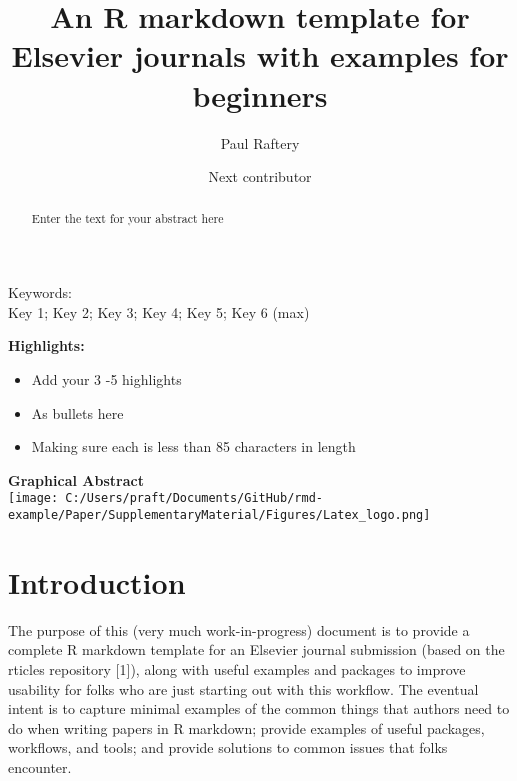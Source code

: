 \documentclass[]{elsarticle} %
\makeatletter
\providecommand{\tightlist}{%
  \setlength{\itemsep}{0pt}\setlength{\parskip}{0pt}}
\def\maxwidth{\ifdim\Gin@nat@width>\linewidth\linewidth
\else\Gin@nat@width\fi}
\let\Oldincludegraphics\includegraphics
\renewcommand{\includegraphics}[1]{\Oldincludegraphics[width=\maxwidth]{#1}}
\theoremstyle{definition}
\theoremstyle{definition}
\theoremstyle{definition}
\theoremstyle{remark}
\makeatother
\begin{document}
\begin{frontmatter}

  \title{An R markdown template for Elsevier journals with examples for beginners}
    \author[CBE]{Paul Raftery}
    \author[Organisation2]{Next contributor}
  
  
      \address[CBE]{Center for the Built Environment, UC Berkeley, 390 Wurster Hall,
Berkeley, CA, 94720, USA}
    \address[Organisation2]{Another organization, and their address}
  
  \begin{abstract}
  Enter the text for your abstract here
  \end{abstract}
  
 \end{frontmatter}

Keywords:\\
Key 1; Key 2; Key 3; Key 4; Key 5; Key 6 (max)

\pagebreak

\textbf{Highlights:}

\begin{itemize}
\tightlist
\item
  Add your 3 -5 highlights
\item
  As bullets here
\item
  Making sure each is less than 85 characters in length
\end{itemize}

\textbf{Graphical Abstract}\\
\texttt{[image: C:/Users/praft/Documents/GitHub/rmd-example/Paper/SupplementaryMaterial/Figures/Latex\_logo.png]}

\pagebreak

\hypertarget{introduction}{%
\section{Introduction}\label{introduction}}

The purpose of this (very much work-in-progress) document is to provide
a complete R markdown template for an Elsevier journal submission (based
on the rticles repository {[}1{]}), along with useful examples and
packages to improve usability for folks who are just starting out with
this workflow. The eventual intent is to capture minimal examples of the
common things that authors need to do when writing papers in R markdown;
provide examples of useful packages, workflows, and tools; and provide
solutions to common issues that folks encounter.
\end{document}
